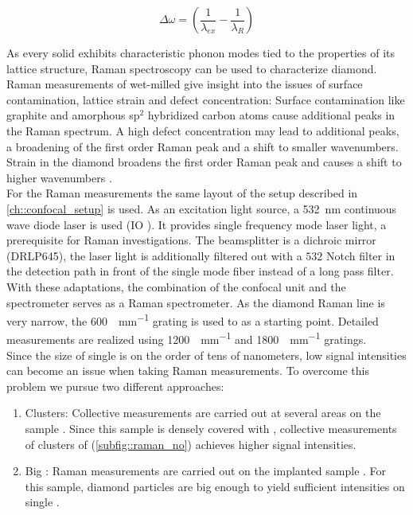 			\begin{equation}
				\Delta \omega = \left( \frac{1}{\lambda_{ex}}-\frac{1}{\lambda_R}\right)
			\end{equation}

			As every solid exhibits characteristic phonon modes tied to the properties of its lattice structure, Raman spectroscopy can be used to characterize diamond.
			Raman measurements of wet-milled \nds give insight into the issues of surface contamination, lattice strain and defect concentration:
			Surface contamination like graphite and amorphous sp$^2$ hybridized carbon atoms cause additional peaks in the Raman spectrum.
			A high defect concentration may lead to additional peaks, a broadening of the first order Raman peak and a shift to smaller wavenumbers.
			Strain in the diamond broadens the first order Raman peak and causes a shift to higher wavenumbers \cite{Zaitsev2001,Prawer2004,Orwa2000}.
			\\
			For the Raman measurements the same layout of the setup described in \autoref{ch::confocal_setup} is used.
			As an excitation light source, a \SI{532}{nm} continuous wave diode laser is used (IO ).
			It provides single frequency mode laser light, a prerequisite for Raman investigations.
			The beamsplitter is a dichroic mirror (DRLP645), the laser light is additionally filtered out with a $532$ Notch filter in the detection path in front of the single mode fiber instead of a long pass filter.
			With these adaptations, the combination of the confocal unit and the spectrometer serves as a Raman spectrometer.
			As the diamond Raman line is very narrow, the \SI[per-mode=symbol]{600}{\lines\per\mm} grating is used to as a starting point. Detailed measurements are realized using \SI[per-mode=symbol]{1200}{\lines\per\mm} and \SI[per-mode=symbol]{1800}{\lines\per\mm} gratings.
			\\

			Since the size of single \nds is on the order of tens of nanometers, low signal intensities can become an issue when taking Raman measurements.
			To overcome this problem we pursue two different approaches:
			\begin{enumerate}[label=\alph*),ref=\alph*)]
				\item \Nd Clusters: \label{item::raman_gband} Collective measurements are carried out at several areas on the sample \insituS. Since this sample is densely covered with \nds, collective measurements of clusters of \nds (\cref{subfig::raman_no}) achieves higher signal intensities.
				\item Big \Nds: \label{item::raman_implanted} Raman measurements are carried out on the implanted sample \implantedTao. For this sample, diamond particles are big enough to yield sufficient intensities on single \nds.
			\end{enumerate}

